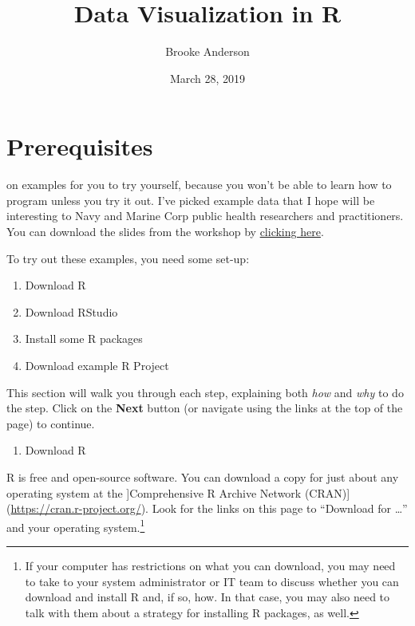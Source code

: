 \documentclass[]{tufte-book}
\title{Data Visualization in R}
\author{Brooke Anderson}
\date{March 28, 2019}
\providecommand{\tightlist}{%
  \setlength{\itemsep}{0pt}\setlength{\parskip}{0pt}}
\begin{document}
\maketitle



{
\setcounter{tocdepth}{1}
\tableofcontents
}

\hypertarget{prerequisites}{%
\chapter{Prerequisites}\label{prerequisites}}

 on examples for you to try yourself,
because you
won't be able to learn how to program unless you try it out. I've picked
example data that I hope will be interesting to Navy and Marine Corp public
health researchers and practitioners. You can download the slides from the
workshop by \href{https://github.com/geanders/navy_public_health/raw/master/_workshop_slides/workshop_slides.pdf}{clicking here}.

To try out these examples, you need some set-up:

\begin{enumerate}
\def\labelenumi{\arabic{enumi}.}
\tightlist
\item
  Download R
\item
  Download RStudio
\item
  Install some R packages
\item
  Download example R Project
\end{enumerate}

This section will walk you through each step, explaining both \emph{how} and
\emph{why} to do the step. Click on the \textbf{Next} button (or navigate using the
links at the top of the page) to continue.

\begin{enumerate}
\def\labelenumi{\arabic{enumi}.}
\tightlist
\item
  Download R
\end{enumerate}

R is free and open-source software. You can download a copy for just about any
operating system at the {]}Comprehensive R Archive Network (CRAN){]} (\url{https://cran.r-project.org/}).
Look for the links on this page to ``Download for \ldots{}'' and your operating system.\footnote{If your computer has restrictions on what you can download, you may need to take to your
  system administrator or IT team to discuss whether you can download and install R and, if
  so, how. In that case, you may also need to talk with them about a strategy for installing
  R packages, as well.}
\end{document}
